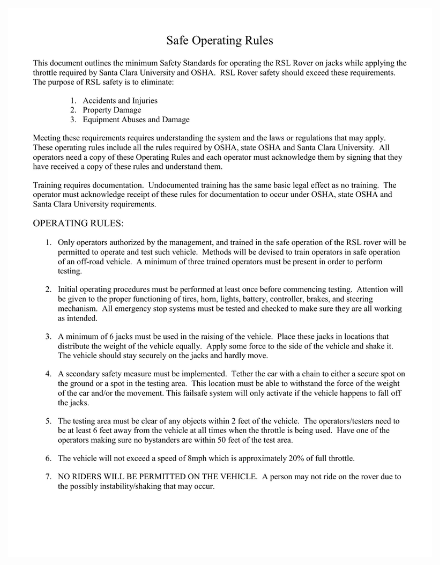 \begin{figure}[H]
	\centerline{\includegraphics[width=1.0\linewidth]{Safety_Procedure_Car_On_Jacks.pdf}}
\end{figure}